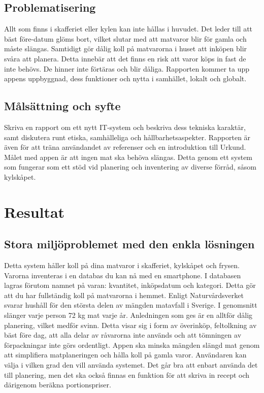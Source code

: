 \documentclass[12pt, a4paper]{article}
\begin{document}
\subsection{Problematisering}
Allt som finns i skafferiet eller kylen kan inte hållas i huvudet. Det leder till att bäst före-datum glöms bort, vilket slutar med att matvaror blir för gamla och måste slängas. Samtidigt gör dålig koll på matvarorna i huset att inköpen blir svåra att planera. Detta innebär att det finns en risk att varor köps in fast de inte behövs. De hinner inte förtäras och blir dåliga. 
\noindent \newline \newline
Rapporten kommer ta upp appens uppbyggnad, dess funktioner och nytta i samhället, lokalt och globalt.


\subsection{Målsättning och syfte}
Skriva en rapport om ett nytt IT-system och beskriva dess tekniska karaktär, samt diskutera runt etiska, samhälleliga och hållbarhetsaspekter. Rapporten är även för att träna användandet av referenser och en introduktion till Urkund. 
\noindent \newline \newline
Målet med appen är att ingen mat ska behöva slängas. Detta genom ett system som fungerar som ett stöd vid planering och inventering av diverse förråd, såsom kylskåpet.

\pagebreak

\section{Resultat}


\subsection{Stora miljöproblemet med den enkla lösningen}
Detta system håller koll på dina matvaror i skafferiet, kylskåpet och frysen. Varorna inventeras i en databas du kan nå med en smartphone. I databasen lagras förutom namnet på varan: kvantitet, inköpsdatum och kategori. Detta gör att du har fullständig koll på matvarorna i hemmet. 
\noindent \newline \newline
Enligt Naturvårdsverket svarar hushåll för den största delen av mängden matavfall i Sverige. I genomsnitt slänger varje person 72 kg mat varje år. Anledningen som ges är en alltför dålig planering, vilket medför svinn. Detta visar sig i form av överinköp, feltolkning av bäst före dag, att alla delar av råvarorna inte används och att tömningen av förpackningar inte görs ordentligt.\cite{Nverket}
\noindent \newline \newline
Appen ska minska mängden slängd mat genom att simplifiera matplaneringen och hålla koll på gamla varor. Användaren kan välja i vilken grad den vill använda systemet. Det går bra att enbart använda det till planering, men det ska också finnas en funktion för att skriva in recept och därigenom beräkna portionspriser. 
\end{document}
